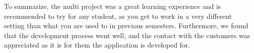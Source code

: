 To summarize, the multi project was a great learning experience and is recommended to try for any student, as you get to work in a very different setting than what you are used to in previous semesters. 
Furthermore, we found that the development process went well, and the contact with the customers was appreciated as it is for them the application is developed for.


% 

